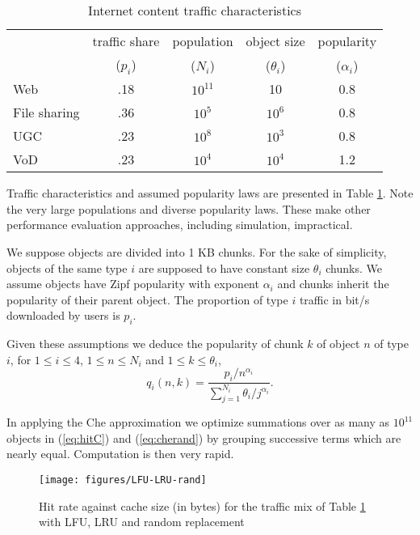 \documentclass{amsart}
\begin{document}
\begin{table}[t]
\begin{center}
\begin{tabular}{l  |  c |c| c| c }
\hline
 & traffic share &  population  & object size & popularity \\
  &($p_i$)  & ($N_i$)&  ($\theta_i$) & ($\alpha_i$)\\
   \hline
Web   & .18 & $10^{11}$ & 10  & 0.8 \\
File sharing  & .36 & $10^{5}$  &  $10^6$ & 0.8\\
UGC  & .23 &  $10^8$  &  $10^3$ & 0.8 \\
VoD & .23 & $10^4$ &  $10^4$ & 1.2 \\ 
\hline
\end{tabular}
\caption{ Internet content traffic characteristics}
\label{tab:characteristics}
\vspace{-3mm}
\end{center}
\end{table}

Traffic characteristics and assumed popularity laws are presented in Table \ref{tab:characteristics}. Note the very large populations and diverse popularity laws. These make other performance evaluation approaches, including simulation, impractical. 

We suppose objects are divided into 1 KB chunks. For the sake of simplicity, objects of the same type $i$ are supposed to have constant size $\theta_i$ chunks.  We assume objects have Zipf popularity with exponent $\alpha_i$ and chunks inherit the popularity of their parent object.  The proportion of type $i$ traffic in bit/s downloaded by users is $p_i$. 

Given these assumptions we deduce the popularity of chunk $k$ of object $n$ of type $i$, for $1 \le i \le 4$, $1\le n \le N_i$ and $1\le k \le \theta_i$,
$$ q_i(n,k) = \frac{p_i/n^{\alpha_i} }{ \sum_{j=1}^{N_i} \theta_i/j^{\alpha_i} }.$$

In applying the Che approximation we optimize summations over as many as  $10^{11}$ objects in (\ref{eq:hitC}) and (\ref{eq:cherand}) by grouping successive terms which are nearly equal. Computation is then very rapid.

\begin{figure}
  \centering
\texttt{[image: figures/LFU-LRU-rand]}    
\caption{Hit rate against cache size (in bytes) for the traffic mix of Table \ref{tab:characteristics} with LFU, LRU and random replacement}
 \label{fig:lruvsrand}
 \vspace{-2mm}

\end{figure}
\end{document}
